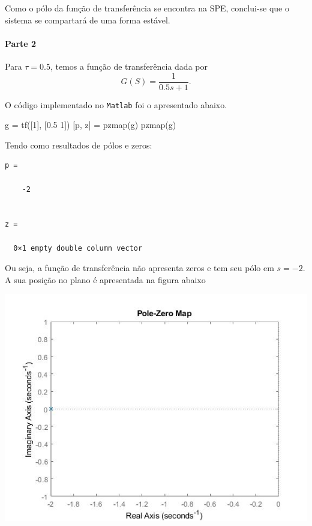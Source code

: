 \documentclass[
]{book}
\newenvironment{Shaded}{\begin{snugshade}}{\end{snugshade}}
\newcommand{\FloatTok}[1]{\textcolor[rgb]{0.00,0.00,0.81}{#1}}
\newcommand{\NormalTok}[1]{#1}
\theoremstyle{definition}
\theoremstyle{definition}
\theoremstyle{definition}
\theoremstyle{remark}
\begin{document}
Como o pólo da função de transferência se encontra na SPE, conclui-se que o sistema se compartará de uma forma estável.

\hypertarget{parte-2}{%
\paragraph{Parte 2}\label{parte-2}}

Para \(\tau = 0.5\), temos a função de transferência dada por
\[
G(S)= \frac {1}{0.5s+1}.
\]

O código implementado no \texttt{Matlab} foi o apresentado abaixo.

\begin{Shaded}
\begin{Highlighting}[]
\NormalTok{g = tf([}\FloatTok{1}\NormalTok{], [}\FloatTok{0.5} \FloatTok{1}\NormalTok{])}
\NormalTok{[p, z] = pzmap(g)}
\NormalTok{pzmap(g)}
\end{Highlighting}
\end{Shaded}

Tendo como resultados de pólos e zeros:

\begin{verbatim}
p =

    -2


z =

  0×1 empty double column vector
\end{verbatim}

Ou seja, a função de transferência não apresenta zeros e tem seu pólo em \(s = -2\). A sua posição no plano é apresentada na figura abaixo

\includegraphics{Imagens/Lab2/tau2.jpg}
\end{document}

